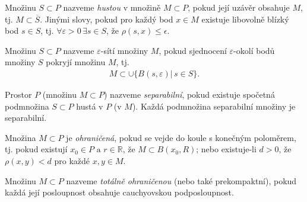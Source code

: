 \begin{definition}
Množinu $S\subset P$ nazveme \textit{hustou} v množině $M\subset P$, pokud její uzávěr obsahuje $M$, tj.
$M \subset\overline{S}$. Jinými slovy, pokud pro každý bod $x\in M$ existuje libovolně blízký bod $s\in S$, tj. $\forall \varepsilon>0 \, \exists s\in S$, že $\rho(s,x)\leq\epsilon$.
\end{definition}
\begin{definition}
Množinu $S\subset P$ nazveme $\varepsilon$-sítí množiny $M$, pokud sjednocení $\varepsilon$-okolí bodů množiny $S$ pokryjí množinu $M$, tj. 
\begin{align*}
M\subset \cup \{B(s,\varepsilon)|\,s\in S\}.
\end{align*}
\end{definition}
\begin{definition}
Prostor $P$ (množinu $M\subset P$) nazveme \textit{separabilní}, pokud existuje spočetná podmnožina $S\subset P$ hustá v $P$ (v $M$). Každá podmnožina separabilní množiny je separabilní.
\end{definition}
\begin{definition}
Množina $M\subset P$ je \textit{ohraničená}, pokud se vejde do koule s konečným poloměrem, tj.
pokud existují $x_0\in P \text{ a } r\in \mathbb{R}$, že $M\subset B(x_0, R)$; nebo existuje-li $d > 0$, že $\rho(x, y) < d$ pro každé $x, y\in M$.
\end{definition}
\begin{definition}
Množinu $M\subset P$ nazveme \textit{totálně ohraničenou} (nebo také prekompaktní), pokud
každá její posloupnost obsahuje cauchyovskou podposloupnost.
\end{definition}
